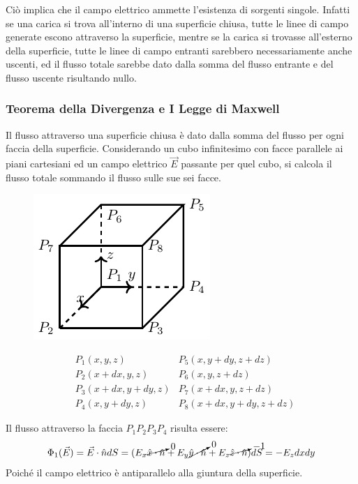 \documentclass{article}
\numberwithin{equation}{subsection}
\begin{document}
Ciò implica che il campo elettrico ammette l'esistenza di sorgenti singole. Infatti se una carica si trova all'interno di una superficie chiusa, tutte le linee di campo generate 
escono attraverso la superficie, mentre se la carica si trovasse all'esterno della superficie, tutte le linee di campo entranti sarebbero necessariamente anche uscenti, ed il 
flusso totale sarebbe dato dalla somma del flusso entrante e del flusso uscente risultando nullo. 

\subsubsection{Teorema della Divergenza e I Legge di Maxwell}

Il flusso attraverso una superficie chiusa è dato dalla somma del flusso per ogni faccia della superficie. Considerando un cubo infinitesimo con facce parallele ai piani 
cartesiani ed un campo elettrico $\vec{E}$ passante per quel cubo, si calcola il flusso totale sommando il flusso sulle sue sei facce. 
\begin{figure}[H]%
    \centering
    \includegraphics{teorema-divergenza.pdf}
    \label{fig:teorema-divergenza}
\end{figure}
\begin{align*}
    &P_1(x,y,z) &P_5(x,y+dy,z+dz)\\
    &P_2(x+dx,y,z) &P_6(x,y,z+dz)\\
    &P_3(x+dx,y+dy,z) &P_7(x+dx,y,z+dz)\\
    &P_4(x,y+dy,z) &P_8(x+dx,y+dy,z+dz)
\end{align*}

Il flusso attraverso la faccia $P_1P_2P_3P_4$ risulta essere:
\begin{equation*}
    \Phi_1(\vec{E})=\vec{E}\cdot\hat{n}dS=(E_x\cancelto{0}{\hat{x}\cdot\hat{n}}+E_y\cancelto{0}{\hat{y}\cdot\hat{n}}+E_z\cancelto{-1}{\hat{z}\cdot\hat{n}})dS=-E_zdxdy
\end{equation*}
Poiché il campo elettrico è antiparallelo alla giuntura della superficie. 
\end{document}
